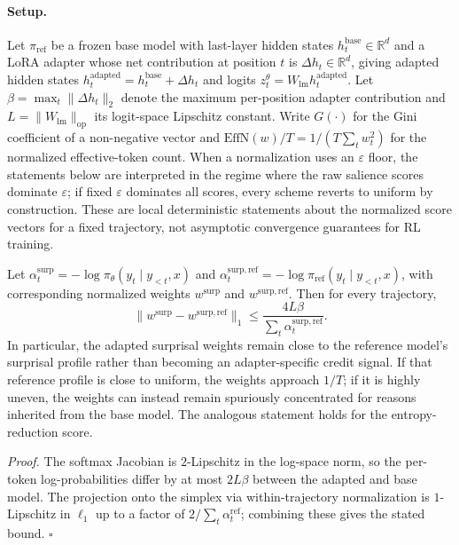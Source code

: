 \paragraph{Setup.}
Let $\pi_{\mathrm{ref}}$ be a frozen base model with last-layer hidden states
$h_t^{\mathrm{base}} \in \mathbb{R}^d$ and a LoRA adapter whose net
contribution at position $t$ is $\Delta h_t \in \mathbb{R}^d$, giving
adapted hidden states $h_t^{\mathrm{adapted}} = h_t^{\mathrm{base}} + \Delta
h_t$ and logits $z_t^{\theta} = W_{\mathrm{lm}} h_t^{\mathrm{adapted}}$.
Let $\beta = \max_t \|\Delta h_t\|_2$ denote the maximum per-position
adapter contribution and $L = \|W_{\mathrm{lm}}\|_{\mathrm{op}}$ its
logit-space Lipschitz constant. Write $G(\cdot)$ for the Gini coefficient
of a non-negative vector and $\mathrm{EffN}(w)/T = 1 / (T \sum_t w_t^2)$ for
the normalized effective-token count. When a normalization uses an
$\varepsilon$ floor, the statements below are interpreted in the regime where
the raw salience scores dominate $\varepsilon$; if fixed $\varepsilon$
dominates all scores, every scheme reverts to uniform by construction.
These are local deterministic statements about the normalized score vectors
for a fixed trajectory, not asymptotic convergence guarantees for RL training.

\begin{proposition}
\label{prop:surprisal-collapse}
Let $\alpha_t^{\mathrm{surp}} = -\log \pi_\theta(y_t \mid y_{<t}, x)$ and
$\alpha_t^{\mathrm{surp,ref}} = -\log \pi_{\mathrm{ref}}(y_t \mid y_{<t}, x)$,
with corresponding normalized weights $w^{\mathrm{surp}}$ and
$w^{\mathrm{surp,ref}}$. Then for every trajectory,
\[
\lVert w^{\mathrm{surp}} - w^{\mathrm{surp,ref}} \rVert_1
\le \frac{4 L \beta}{\sum_t \alpha_t^{\mathrm{surp,ref}}}.
\]
In particular, the adapted surprisal weights remain close to the reference
model's surprisal profile rather than becoming an adapter-specific credit
signal. If that reference profile is close to uniform, the weights approach
$1/T$; if it is highly uneven, the weights can instead remain spuriously
concentrated for reasons inherited from the base model. The analogous
statement holds for the entropy-reduction score.
\end{proposition}

\noindent\emph{Proof.}
The softmax Jacobian is $2$-Lipschitz in the log-space norm, so the per-token
log-probabilities differ by at most $2 L \beta$ between the adapted and base
model. The projection onto the simplex via within-trajectory normalization is
$1$-Lipschitz in $\ell_1$ up to a factor of $2 / \sum_t \alpha_t^{\mathrm{ref}}$;
combining these gives the stated bound. \hfill$\square$

